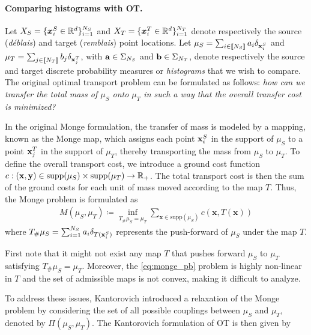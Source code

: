 \paragraph{Comparing histograms with OT.}
Let $X_S = \{ \bm{x}_i^S \in \mathbb{R}^d \}_{i=1}^{N_S}$ and $X_T = \{ \bm{x}_i^T \in \mathbb{R}^d \}_{i=1}^{N_T}$ denote respectively the source (\emph{déblais}) and target (\emph{remblais}) point locations. Let  \(\mu_S = \sum_{i \in {[\![N_S]\!]}} a_i \delta_{{\mathbf{x}}^S_i}\) and \(\mu_T = \sum_{j \in {[\![N_T]\!]}} b_j \delta_{{\mathbf{x}}^T_j}\), with ${\mathbf{a}} \in \Sigma_{N_S}$ and ${\mathbf{b}} \in \Sigma_{N_T}$, denote respectively the source and target discrete probability measures or \emph{histograms} that we wish to compare. The original optimal transport problem can be formulated as follows: \emph{how can we transfer the total mass of \(\mu_S\) onto \(\mu_T\) in such a way that the overall transfer cost is minimized?}

In the original Monge formulation, the transfer of mass is modeled by a mapping, known as the Monge map, which assigns each point \({\mathbf{x}}^S_i\) in the support of \(\mu_S\) to a point \({\mathbf{x}}^T_j\) in the support of \(\mu_T\), thereby transporting the mass from \(\mu_S\) to \(\mu_T\). To define the overall transport cost, we introduce a ground cost function \(c: ({\mathbf{x}}, {\mathbf{y}}) \in \text{supp}(\mu_S) \times \text{supp}(\mu_T) \to \mathbb{R}_+\). The total transport cost is then the sum of the ground costs for each unit of mass moved according to the map \(T\). Thus, the Monge problem is formulated as
\begin{align}
    \label{eq:monge_pb}
    \tag{Monge}
    M(\mu_S, \mu_T) \coloneqq \inf_{T_{\#}\mu_S = \mu_T} \sum_{\bm{x} \in \text{supp}(\mu_S)} c(\bm{x}, T(\bm{x}))
\end{align}
where \(T_{\#}\mu_S = \sum_{i=1}^{N_S} a_i \delta_{T({\mathbf{x}}_i^S)}\) represents the push-forward of \(\mu_S\) under the map \(T\).

First note that it might not exist any map \(T\) that pushes forward \(\mu_S\) to \(\mu_T\) \ie satisfying $T_{\#}\mu_S = \mu_T$. Moreover, the \ref{eq:monge_pb} problem is highly non-linear in \(T\) and the set of admissible maps is not convex, making it difficult to analyze. 


To address these issues, Kantorovich introduced a relaxation of the Monge problem by considering the set of all possible couplings between \(\mu_S\) and \(\mu_T\), denoted by \(\Pi(\mu_S, \mu_T)\). The Kantorovich formulation of OT is then given by


